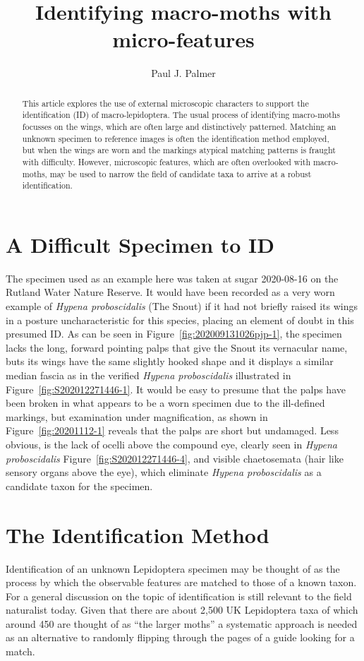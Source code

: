 \documentclass[]{article}
\title{Identifying macro-moths with micro-features}
\author{Paul J. Palmer}
\begin{document}
\maketitle

\begin{abstract}

This article explores the use of external microscopic characters to support the identification (ID) of  macro-lepidoptera. The usual process of identifying macro-moths  focusses on the wings, which are often large and distinctively patterned. Matching an unknown specimen to reference images is often the identification method employed, but when the wings are worn and the markings atypical matching patterns is fraught with difficulty.
 However, microscopic features, which are often overlooked with macro-moths, may be used to narrow the field of candidate taxa to arrive at a robust identification. 

\end{abstract}

\section*{A Difficult Specimen to ID}
The specimen used as an example here was taken at sugar 2020-08-16 on the Rutland Water Nature Reserve. It would have been recorded as a very worn example of \textit{Hypena proboscidalis} (The Snout) if it had not briefly raised its wings in a posture uncharacteristic for this species, placing an element of doubt in this presumed ID. As can be seen in Figure~\ref{fig:202009131026pjp-1}, the specimen lacks the long, forward pointing palps that give the Snout its vernacular name, buts its wings have the same slightly hooked shape  and it displays a similar median fascia as in the verified \textit{Hypena proboscidalis} illustrated in  Figure~\ref{fig:S202012271446-1}.  It would be easy to presume that the palps have been broken in what appears to be a worn specimen due to the ill-defined markings, but examination under magnification, as shown in  Figure~\ref{fig:20201112-1} reveals that the palps are short but undamaged. Less obvious,  is the lack of ocelli above the compound eye, clearly seen in \textit{Hypena proboscidalis} Figure~\ref{fig:S202012271446-4}, and visible chaetosemata (hair like sensory organs above the eye), which  eliminate \textit{Hypena proboscidalis} as a candidate taxon for the specimen.

\section*{The Identification Method}
Identification of an unknown Lepidoptera specimen may be thought of as the process by which the  observable features are matched to those of a known taxon.
For a general discussion on the topic of identification \citet{Pankhurst1978} is still relevant to the field naturalist today.
 Given that there are about 2,500 UK Lepidoptera taxa of which around 450 are thought of as \enquote{the larger moths} a systematic approach is needed as an alternative to randomly flipping through the pages of a guide looking for a match.
 
\end{document}
